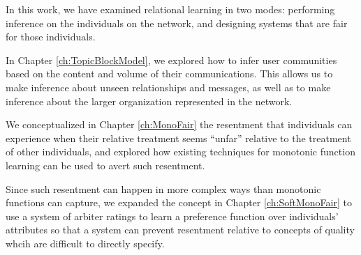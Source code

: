 In this work, we have examined relational learning in two modes: performing inference on the individuals on the network, and designing systems that are fair for those individuals. 

In Chapter \ref{ch:TopicBlockModel}, we explored how to infer user communities based on the content and volume of their communications. This allows us to make inference about unseen relationships and messages, as well as to make inference about the larger organization represented in the network.

We conceptualized in Chapter \ref{ch:MonoFair} the resentment that individuals can experience when their relative treatment seems ``unfar'' relative to the treatment of other individuals, and explored how existing techniques for monotonic function learning can be used to avert such resentment.

Since such resentment can happen in more complex ways than monotonic functions can capture, we expanded the concept in Chapter \ref{ch:SoftMonoFair} to use a system of arbiter ratings to learn a preference function over individuals' attributes so that a system can prevent resentment relative to concepts of quality whcih are difficult to directly specify.